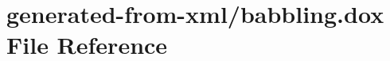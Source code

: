 \hypertarget{babbling_8dox}{}\section{generated-\/from-\/xml/babbling.dox File Reference}
\label{babbling_8dox}
